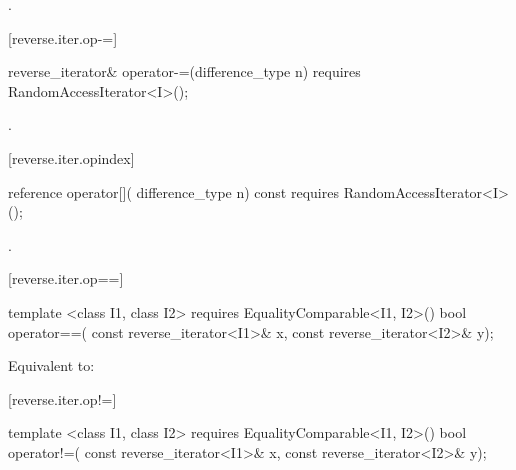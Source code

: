 \begin{itemdescr}
\pnum
\returns
{}.
\end{itemdescr}

[reverse.iter.op-=]{}

%
\begin{itemdecl}
reverse_iterator&
  operator-=(difference_type n)
    requires RandomAccessIterator<I>();
\end{itemdecl}

\begin{itemdescr}
\pnum
\effects
{}

\pnum
\returns
{}.
\end{itemdescr}

[reverse.iter.opindex]{}

%
\begin{itemdecl}
reference operator[](
  difference_type n) const
    requires RandomAccessIterator<I>();
\end{itemdecl}

\begin{itemdescr}
\pnum
\returns
{}.
\end{itemdescr}

[reverse.iter.op==]{}

%
\begin{itemdecl}
template <class I1, class I2>
    requires EqualityComparable<I1, I2>()
  bool operator==(
    const reverse_iterator<I1>& x,
    const reverse_iterator<I2>& y);
\end{itemdecl}

\begin{itemdescr}
\pnum
\effects Equivalent to:
\end{itemdescr}

[reverse.iter.op!=]{}

%
\begin{itemdecl}
template <class I1, class I2>
    requires EqualityComparable<I1, I2>()
  bool operator!=(
    const reverse_iterator<I1>& x,
    const reverse_iterator<I2>& y);
\end{itemdecl}

